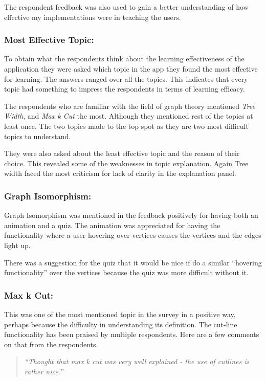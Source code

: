 The respondent feedback was also used to gain a better understanding of how effective my implementations were in teaching the users.

\subsubsection{Most Effective Topic:}
To obtain what the respondents think about the learning effectiveness of the
application they were asked which topic in the app they found the most effective
for learning. The answers ranged over all the topics. This indicates that every
topic had something to impress the respondents in terms of learning efficacy.


The respondents who are familiar with the field of graph theory mentioned
\emph{Tree Width}, and \emph{Max k Cut} the most. Although they mentioned rest
of the topics at least once. The two topics made to the top spot as they are
two most difficult topics to understand.

They were also asked about the least effective topic and the reason of their choice. 
This revealed some of the weaknesses in topic explanation. Again Tree width
faced the most criticism for lack of clarity in the explanation panel. 

\subsubsection{Graph Isomorphism:}
Graph Isomorphism was mentioned in the feedback positively for having both an
animation and a quiz. The animation was appreciated for having the
functionality where a user hovering over vertices causes the vertices and
the edges light up. 

There was a suggestion for the quiz 
that it would be nice if do a similar ``hovering functionality'' over the
vertices because the quiz was more difficult without it.

\subsubsection{Max k Cut:}
This was one of the most mentioned topic in the survey in a positive way,
perhaps because the difficulty in understanding its definition. The cut-line
functionality has been praised by multiple respondents. Here are a few
comments on that from the respondents.

\begin{quote}
\emph{``Thought that max k cut was very well explained - the use of cutlines is
rather nice.''}
\end{quote}

